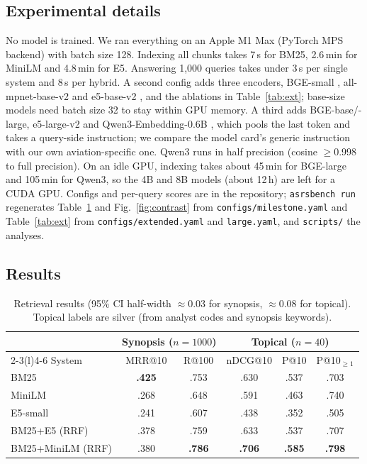 \documentclass[conference]{IEEEtran}
\begin{document}
\subsection{Experimental details}
No model is trained. We ran everything on an Apple M1 Max (PyTorch MPS backend) with
batch size 128. Indexing all chunks takes 7\,s for BM25, 2.6\,min for MiniLM and 4.8\,min
for E5. Answering 1,000 queries takes under 3\,s per single system and 8\,s per hybrid.
A second config adds three encoders, BGE-small \cite{xiao2023cpack}, all-mpnet-base-v2
\cite{song2020mpnet} and e5-base-v2 \cite{wang2022e5}, and the ablations in
Table~\ref{tab:ext}; base-size models need batch size 32 to stay within GPU memory. A
third adds BGE-base/-large, e5-large-v2 and Qwen3-Embedding-0.6B \cite{zhang2025qwen3emb},
which pools the last token and takes a query-side instruction; we compare the model card's
generic instruction with our own aviation-specific one. Qwen3 runs in half precision
(cosine $\ge$0.998 to full precision). On an idle GPU, indexing takes about 45\,min for BGE-large
and 105\,min for Qwen3, so the 4B and 8B models (about 12\,h) are left for a CUDA GPU. Configs
and per-query scores are in the repository; \texttt{asrsbench run} regenerates
Table~\ref{tab:main} and Fig.~\ref{fig:contrast} from \texttt{configs/milestone.yaml} and
Table~\ref{tab:ext} from \texttt{configs/extended.yaml} and \texttt{large.yaml}, and
\texttt{scripts/} the analyses.

\subsection{Results}
\begin{table}[t]
\centering
\caption{Retrieval results (95\% CI half-width $\approx$0.03 for synopsis, $\approx$0.08 for topical).
Topical labels are silver (from analyst codes and synopsis keywords).}
\label{tab:main}
\setlength{\tabcolsep}{3.2pt}
\begin{tabular}{@{}lccccc@{}}
\toprule
 & \multicolumn{2}{c}{Synopsis ($n{=}1000$)} & \multicolumn{3}{c}{Topical ($n{=}40$)}\\
\cmidrule(lr){2-3}\cmidrule(l){4-6}
System & MRR@10 & R@100 & nDCG@10 & P@10 & P@10$_{\ge1}$\\
\midrule
BM25            & \textbf{.425} & .753 & .630 & .537 & .703\\
MiniLM          & .268 & .648 & .591 & .463 & .740\\
E5-small        & .241 & .607 & .438 & .352 & .505\\
BM25+E5 (RRF)     & .378 & .759 & .633 & .537 & .707\\
BM25+MiniLM (RRF) & .380 & \textbf{.786} & \textbf{.706} & \textbf{.585} & \textbf{.798}\\
\bottomrule
\end{tabular}
\end{table}
\end{document}
